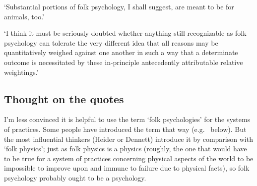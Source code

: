 \documentclass[12pt,\papersize]{extarticle}
\begin{document}
`Substantial portions of folk psychology, I shall suggest, are meant to be for animals, too.' \citep[p.~85]{steward:2012_metaphysics}

`I think it must be seriously doubted whether anything still recognizable as folk psychology can tolerate the very different idea that all reasons may be quantitatively weighed against one another in such a way that a determinate outcome is necessitated by these in-principle antecedently attributable relative weightings.' \citep[p.~147]{steward:2012_metaphysics}

\hypertarget{thought-on-the-quotes}{%
\subsection{Thought on the quotes}\label{thought-on-the-quotes}}

I'm less convinced it is helpful to use the term `folk psychologies' for the systems of practices. Some people have introduced the term that way (e.g.~\citet[p.~25]{bermudez:2003_domain} below). But the most influential thinkers (Heider or Dennett) introduce it by comparison with `folk physics'; just as folk physics is a physics (roughly, the one that would have to be true for a system of practices concerning physical aspects of the world to be impossible to improve upon and immune to failure due to physical facts), so folk psychology probably ought to be a psychology.










\printglossaries


\end{document}
